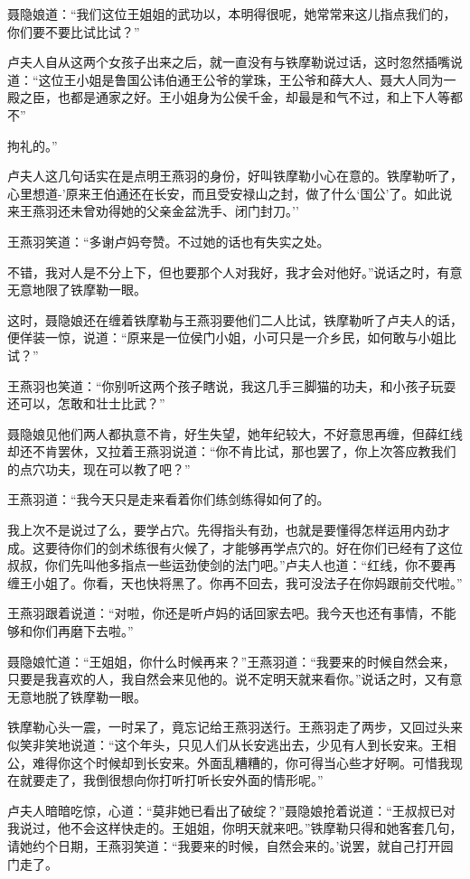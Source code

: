 \documentclass[12pt,oneside]{book}
\begin{document}
聂隐娘道：``我们这位王姐姐的武功以，本明得很呢，她常常来这儿指点我们的，你们要不要比试比试？''

卢夫人自从这两个女孩子出来之后，就一直没有与铁摩勒说过话，这时忽然插嘴说道：``这位王小姐是鲁国公讳伯通王公爷的掌珠，王公爷和薛大人、聂大人同为一殿之臣，也都是通家之好。王小姐身为公侯千金，却最是和气不过，和上下人等都不''

拘礼的。''

卢夫人这几句话实在是点明王燕羽的身份，好叫铁摩勒小心在意的。铁摩勒听了，心里想道-'原来王伯通还在长安，而且受安禄山之封，做了什么`国公'了。如此说来王燕羽还未曾劝得她的父亲金盆洗手、闭门封刀。''

王燕羽笑道：``多谢卢妈夸赞。不过她的话也有失实之处。

不错，我对人是不分上下，但也要那个人对我好，我才会对他好。''说话之时，有意无意地限了铁摩勒一眼。

这时，聂隐娘还在缠着铁摩勒与王燕羽要他们二人比试，铁摩勒听了卢夫人的话，便佯装一惊，说道：``原来是一位侯门小姐，小可只是一介乡民，如何敢与小姐比试？''

王燕羽也笑道：``你别听这两个孩子瞎说，我这几手三脚猫的功夫，和小孩子玩耍还可以，怎敢和壮士比武？''

聂隐娘见他们两人都执意不肯，好生失望，她年纪较大，不好意思再缠，但薛红线却还不肯罢休，又拉着王燕羽说道：``你不肯比试，那也罢了，你上次答应教我们的点穴功夫，现在可以教了吧？''

王燕羽道：``我今天只是走来看着你们练剑练得如何了的。

我上次不是说过了么，要学占穴。先得指头有劲，也就是要懂得怎样运用内劲才成。这要待你们的剑术练很有火候了，才能够再学点穴的。好在你们已经有了这位叔叔，你们先叫他多指点一些运劲使剑的法门吧。''卢夫人也道：``红线，你不要再缠王小姐了。你看，天也快将黑了。你再不回去，我可没法子在你妈跟前交代啦。''

王燕羽跟着说道：``对啦，你还是听卢妈的话回家去吧。我今天也还有事情，不能够和你们再磨下去啦。''

聂隐娘忙道：``王姐姐，你什么时候再来？''王燕羽道：``我要来的时候自然会来，只要是我喜欢的人，我自然会来见他的。说不定明天就来看你。''说话之时，又有意无意地脱了铁摩勒一眼。

铁摩勒心头一震，一时呆了，竟忘记给王燕羽送行。王燕羽走了两步，又回过头来似笑非笑地说道：``这个年头，只见人们从长安逃出去，少见有人到长安来。王相公，难得你这个时候却到长安来。外面乱糟糟的，你可得当心些才好啊。可惜我现在就要走了，我倒很想向你打听打听长安外面的情形呢。''

卢夫人暗暗吃惊，心道：``莫非她已看出了破绽？''聂隐娘抢着说道：``王叔叔已对我说过，他不会这样快走的。王姐姐，你明天就来吧。''铁摩勒只得和她客套几句，请她约个日期，王燕羽笑道：``我要来的时候，自然会来的。'说罢，就自己打开园门走了。
\end{document}
